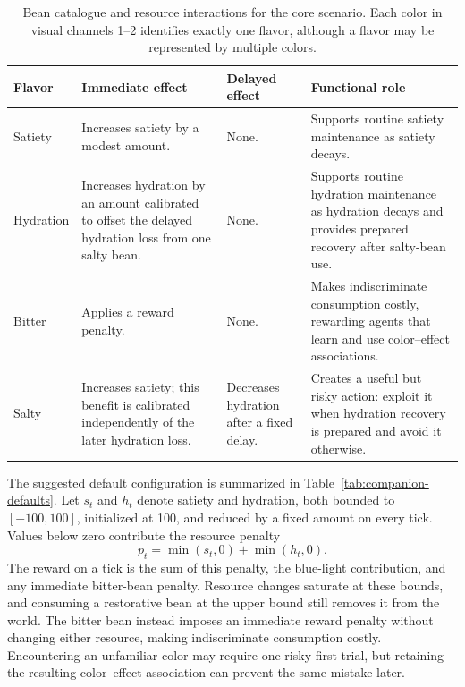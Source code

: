 \documentclass[10pt,journal,compsoc]{IEEEtran}
\begin{document}
\begin{table}[!t]
    \caption{Bean catalogue and resource interactions for the core scenario.
    Each color in visual channels 1--2 identifies exactly one flavor, although a flavor may be represented by multiple colors.}
    \label{tab:bean-catalogue}
    \centering
    \renewcommand{\arraystretch}{1.2}
    \begin{tabularx}{\textwidth}{
        @{}
        >{\raggedright\arraybackslash}p{}
        >{\raggedright\arraybackslash}p{}
        >{\raggedright\arraybackslash}p{}
        >{\raggedright\arraybackslash}X
        @{}
    }
        \toprule
        \textbf{Flavor} & \textbf{Immediate effect} & \textbf{Delayed effect} & \textbf{Functional role} \\
        \midrule
        Satiety & Increases satiety by a modest amount.& None.& Supports routine satiety maintenance as satiety decays.\\
        Hydration & Increases hydration by an amount calibrated to offset the delayed hydration loss from one salty bean.& None.& Supports routine hydration maintenance as hydration decays and provides prepared recovery after salty-bean use.\\
        Bitter & Applies a reward penalty.& None.& Makes indiscriminate consumption costly, rewarding agents that learn and use color--effect associations.\\
        Salty & Increases satiety; this benefit is calibrated independently of the later hydration loss.& Decreases hydration after a fixed delay.& Creates a useful but risky action: exploit it when hydration recovery is prepared and avoid it otherwise.\\
        \bottomrule
    \end{tabularx}
\end{table}

The suggested default configuration is summarized in Table~\ref{tab:companion-defaults}.
Let $s_t$ and $h_t$ denote satiety and hydration, both bounded to $[-100,100]$, initialized at 100, and reduced by a fixed amount on every tick.
Values below zero contribute the resource penalty
\begin{equation}
    p_t=\min(s_t,0)+\min(h_t,0).
\end{equation}
The reward on a tick is the sum of this penalty, the blue-light contribution, and any immediate bitter-bean penalty.
Resource changes saturate at these bounds, and consuming a restorative bean at the upper bound still removes it from the world.
The bitter bean instead imposes an immediate reward penalty without changing either resource, making indiscriminate consumption costly.
Encountering an unfamiliar color may require one risky first trial, but retaining the resulting color--effect association can prevent the same mistake later.
\end{document}
